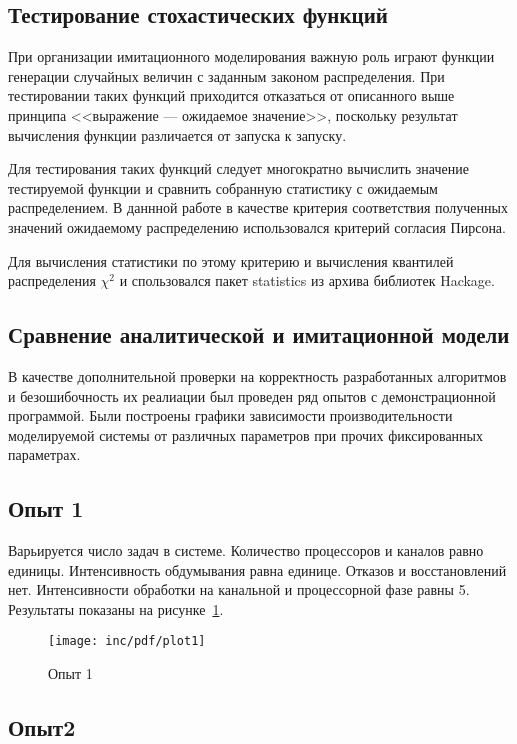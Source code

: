 \subsection{Тестирование стохастических функций}

При организации имитационного моделирования важную роль играют функции генерации случайных величин с заданным законом распределения. При тестировании таких функций приходится отказаться от описанного выше принципа <<выражение --- ожидаемое значение>>, поскольку результат вычисления функции различается от запуска к запуску.

Для тестирования таких функций следует многократно вычислить значение тестируемой функции и сравнить собранную статистику с ожидаемым распределением. В даннной работе в качестве критерия соответствия полученных значений ожидаемому распределению использовался критерий согласия Пирсона.

Для вычисления статистики по этому критерию и вычисления квантилей распределения $\chi^2$ и спользовался пакет statistics из архива библиотек Hackage.

\subsection{Сравнение аналитической и имитационной модели}

В качестве дополнительной проверки на корректность разработанных алгоритмов и безошибочность их реалиации был проведен ряд опытов с демонстрационной программой. Были построены графики зависимости производительности моделируемой системы от различных параметров при прочих фиксированных параметрах.

\subsection*{Опыт 1}

Варьируется число задач в системе. Количество процессоров и каналов равно единицы. Интенсивность обдумывания равна единице. Отказов и восстановлений нет. Интенсивности обработки на канальной и процессорной фазе равны 5. Результаты показаны на рисунке~\ref{fig:plot1}.

\begin{figure}[ht]
  \centering
  \texttt{[image: inc/pdf/plot1]}
  \caption{Опыт 1}
  \label{fig:plot1}
\end{figure}

\subsection*{Опыт2}

